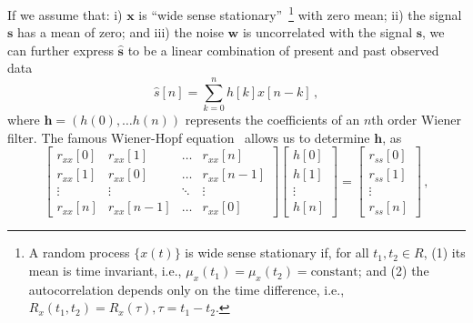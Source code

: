 \documentclass[paper-main.tex]{subfiles}
\begin{document}
If we assume that: i) $\textbf{x}$ is ``wide sense stationary''~\footnote{ A random process $\{x(t)\}$ is wide sense stationary if, for all $t_1,t_2 \in R$, (1) its mean is time invariant, i.e., $\mu_x(t_1)=\mu_x(t_2)=\text{constant}$; and (2) the autocorrelation depends only on the time difference, i.e., $R_x(t_1,t_2)=R_x(\tau),\tau=t_1-t_2$.} with zero mean; ii) the signal $\textbf{s}$ has a mean of zero; and iii) the noise $\textbf{w}$ is uncorrelated with the signal $\textbf{s}$, we can further express $\hat{\textbf{s}}$ to be a linear combination of present and past observed data
\begin{equation}
\hat{{s}}[n]=\sum_{k=0}^{n}h[k]x[n-k]\,,
\end{equation}
where $\textbf{h}=(h(0),\dots h(n))$ represents the coefficients of an $n$th order Wiener filter.
The famous Wiener-Hopf equation~\citep{noble1959methods} allows us to determine $\textbf{h}$, as\begin{equation}
\label{eqn:wiener-hopf}
\begin{bmatrix}  
r_{xx}[0]&r_{xx}[1]&\dots& r_{xx}[n]\\
r_{xx}[1]&r_{xx}[0]&\dots &r_{xx}[n-1]\\
\vdots&\vdots&\ddots&\vdots\\
r_{xx}[n]&r_{xx}[n-1]&\dots &r_{xx}[0]
\end{bmatrix}
\begin{bmatrix}
h[0]\\
h[1]\\
\vdots\\
h[n]
\end{bmatrix}=
\begin{bmatrix}
r_{ss}[0]\\
r_{ss}[1]\\
\vdots\\
r_{ss}[n]
\end{bmatrix}\,,
\end{equation}
\end{document}
